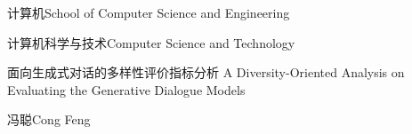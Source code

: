 % 
% 
% 
% 

\school
{计算机}{School of Computer Science and Engineering}

\major
{计算机科学与技术}{Computer Science and Technology}

\thesistitle
{面向生成式对话的多样性评价指标分析}
{}
{A Diversity-Oriented Analysis on Evaluating the Generative Dialogue Models}
{}

\thesisauthor
{冯聪}{Cong Feng}









